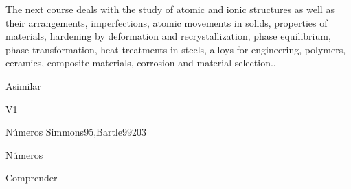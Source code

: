 \begin{syllabus}


\begin{justification}
The next course deals with the study of atomic and ionic structures as well as their
arrangements, imperfections, atomic movements in solids, properties of materials,
hardening by deformation and recrystallization, phase equilibrium, phase
transformation, heat treatments in steels, alloys for engineering, polymers, ceramics,
composite materials, corrosion and material selection.. 
\end{justification}

\begin{goals}
\item Asimilar
\end{goals}

\begin{outcomes}{V1}
   \item {}
   \item {}
   \item {}
\end{outcomes}

\begin{unit}{Números }{}{Simmons95,Bartle99}{20}{3}
   \begin{topics}
      \item Números 
   \end{topics}

   \begin{learningoutcomes}
      \item Comprender 
      \end{learningoutcomes}
\end{unit}


\begin{coursebibliography}
\end{coursebibliography}

\end{syllabus}
